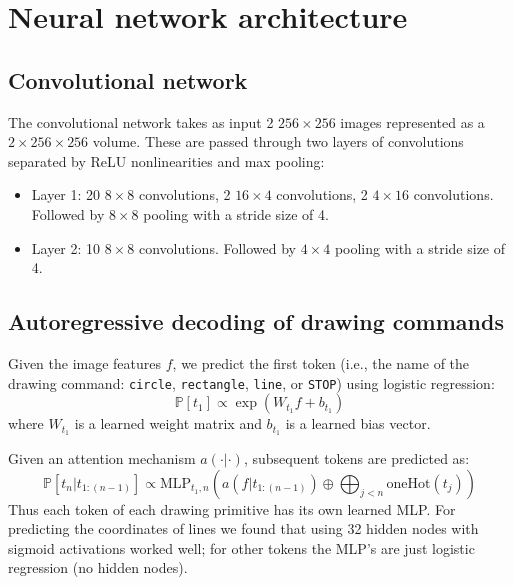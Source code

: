 \documentclass{article}
\newcommand{\probability}{\mathds{P}} %
\begin{document}
\section{Neural network architecture}

\subsection{Convolutional network}
The convolutional network takes as input 2 $256\times 256$ images
represented as a $2\times 256\times 256$ volume. These are
passed through two layers of convolutions separated by ReLU
nonlinearities and max pooling:
\begin{itemize}
\item Layer 1: 20 $8\times 8$ convolutions, 2 $16\times 4$ convolutions, 2 $4\times 16$ convolutions. Followed by $8\times 8$ pooling with a stride size of 4.
\item Layer 2: 10 $8\times 8$ convolutions. Followed by $4\times 4$ pooling with a stride size of 4.
\end{itemize}


\subsection{Autoregressive decoding of drawing commands}

Given the image features $f$, we predict the first token (i.e., the name of the drawing command: \verb|circle|, \verb|rectangle|, \verb|line|, or \verb|STOP|) using logistic regression:
\begin{equation}
  \probability [t_1]\propto \exp\left( W_{t_1}f + b_{t_1}\right)
\end{equation}
where $W_{t_1}$ is a learned weight matrix and  $b_{t_1}$ is a learned bias vector.

Given an attention mechanism $a(\cdot | \cdot)$, subsequent tokens are predicted as:
\begin{equation}
  \probability [t_n|t_{1:(n - 1)}]\propto \text{MLP}_{t_1,n}(a(f|t_{1:(n - 1)}) \oplus \bigoplus_{j < n} \text{oneHot}(t_j))\label{discreteTokenPrediction}
\end{equation}
Thus each token of each drawing primitive has its own learned MLP.
For predicting the coordinates of lines we found that using 32 hidden nodes with sigmoid activations worked well;
for other tokens the MLP's are just logistic regression (no hidden nodes).
\end{document}
